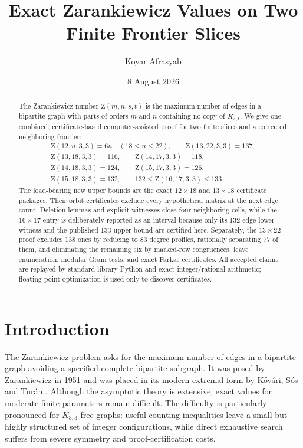 \documentclass[11pt]{amsart}
\title[Exact Zarankiewicz values on two finite frontier slices]{Exact Zarankiewicz Values on Two Finite Frontier Slices}
\author{Koyar Afrasyab}
\date{8 August 2026}
\newcommand{\Z}{\mathrm Z}
\begin{document}
\begin{abstract}
The Zarankiewicz number $\Z(m,n,s,t)$ is the maximum number of edges in a bipartite graph with parts of orders $m$ and $n$ containing no copy of $K_{s,t}$. We give one combined, certificate-based computer-assisted proof for two finite slices and a corrected neighboring frontier:
\[
\begin{gathered}
  \Z(12,n,3,3)=6n\quad(18\le n\le22),
  \qquad \Z(13,22,3,3)=137,\\
  \Z(13,18,3,3)=116,\qquad \Z(14,17,3,3)=118,\\
  \Z(14,18,3,3)=124,\qquad \Z(15,17,3,3)=126,\\
  \Z(15,18,3,3)=132,\qquad 132\le\Z(16,17,3,3)\le133.
\end{gathered}
\]
The load-bearing new upper bounds are the exact $12\times18$ and $13\times18$ certificate packages. Their orbit certificates exclude every hypothetical matrix at the next edge count. Deletion lemmas and explicit witnesses close four neighboring cells, while the $16\times17$ entry is deliberately reported as an interval because only its 132-edge lower witness and the published 133 upper bound are certified here. Separately, the $13\times22$ proof excludes 138 ones by reducing to 83 degree profiles, rationally separating 77 of them, and eliminating the remaining six by marked-row congruences, leave enumeration, modular Gram tests, and exact Farkas certificates. All accepted claims are replayed by standard-library Python and exact integer/rational arithmetic; floating-point optimization is used only to discover certificates.
\end{abstract}
\maketitle

\section{Introduction}
The Zarankiewicz problem asks for the maximum number of edges in a bipartite graph avoiding a specified complete bipartite subgraph. It was posed by Zarankiewicz in 1951 \cite{Zarankiewicz1951} and was placed in its modern extremal form by K\H{o}v\'ari, S\'os and Tur\'an \cite{KST1954}. Although the asymptotic theory is extensive, exact values for moderate finite parameters remain difficult. The difficulty is particularly pronounced for $K_{3,3}$-free graphs: useful counting inequalities leave a small but highly structured set of integer configurations, while direct exhaustive search suffers from severe symmetry and proof-certification costs.
\end{document}
